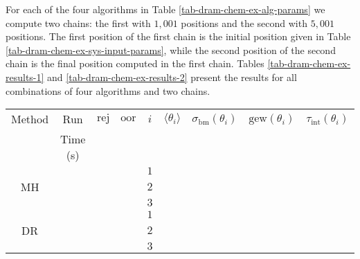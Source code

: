 For each of the four algorithms in Table \ref{tab-dram-chem-ex-alg-params}
we compute two chains: the first with $1,001$ positions and the second with $5,001$ positions.
The first position of the first chain is the initial position given in Table \ref{tab-dram-chem-ex-sys-input-params}, while
the second position of the second chain is the final position computed in the first chain.
Tables \ref{tab-dram-chem-ex-results-1} and \ref{tab-dram-chem-ex-results-2} present the results for all combinations of four
algorithms and two chains.

\begin{table}[h!]
\begin{center}
\begin{tabular}{|c|c|c|c|c|c|c|c|c|}
\hline
Method & Run      & $\text{rej}$           & $\text{oor}$           & $i$ & $\langle\theta_i\rangle$ & $\sigma_{\text{bm}}(\theta_i)$ & $\text{gew}(\theta_i)$ & $\tau_{\text{int}}(\theta_i)$ \\
       & Time (s) &                        &                        &     &                          &                                &                        &                               \\
\hline
\hline
       &          &                        &                        & $1$ &                          &                                &                        &                               \\
\cline{5-9}
MH     &          &                        &                        & $2$ &                          &                                &                        &                               \\
\cline{5-9}
       &          &                        &                        & $3$ &                          &                                &                        &                               \\
\hline
\hline
       &          &                        &                        & $1$ &                          &                                &                        &                               \\
\cline{5-9}
DR     &          &                        &                        & $2$ &                          &                                &                        &                               \\
\cline{5-9}
       &          &                        &                        & $3$ &                          &                                &                        &                               \\

\end{tabular}
\end{center}
\end{table}
